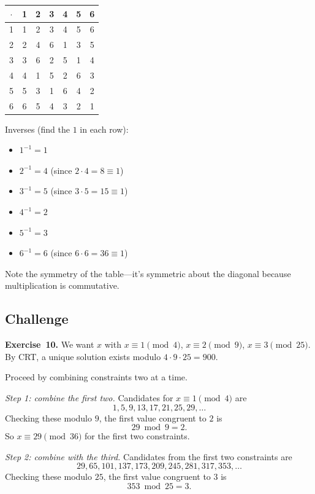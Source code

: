 \documentclass[11pt]{article}
\begin{document}
\begin{center}
\begin{tabular}{c|cccccc}
\toprule
$\cdot$ & 1 & 2 & 3 & 4 & 5 & 6 \\
\midrule
1 & 1 & 2 & 3 & 4 & 5 & 6 \\
2 & 2 & 4 & 6 & 1 & 3 & 5 \\
3 & 3 & 6 & 2 & 5 & 1 & 4 \\
4 & 4 & 1 & 5 & 2 & 6 & 3 \\
5 & 5 & 3 & 1 & 6 & 4 & 2 \\
6 & 6 & 5 & 4 & 3 & 2 & 1 \\
\bottomrule
\end{tabular}
\end{center}
Inverses (find the $1$ in each row):
\begin{itemize}
  \item $1^{-1} = 1$
  \item $2^{-1} = 4$ (since $2 \cdot 4 = 8 \equiv 1$)
  \item $3^{-1} = 5$ (since $3 \cdot 5 = 15 \equiv 1$)
  \item $4^{-1} = 2$
  \item $5^{-1} = 3$
  \item $6^{-1} = 6$ (since $6 \cdot 6 = 36 \equiv 1$)
\end{itemize}
Note the symmetry of the table---it's symmetric about the diagonal because multiplication is commutative.

\subsection*{Challenge}

\textbf{Exercise~10.}
We want $x$ with $x \equiv 1 \pmod 4$, $x \equiv 2 \pmod 9$, $x \equiv 3 \pmod{25}$. By CRT, a unique solution exists modulo $4 \cdot 9 \cdot 25 = 900$.

Proceed by combining constraints two at a time.

\emph{Step 1: combine the first two.} Candidates for
$x \equiv 1 \pmod 4$ are
\[
  1, 5, 9, 13, 17, 21, 25, 29, \ldots
\]
Checking these modulo $9$, the first value congruent to $2$ is
\[
  29 \bmod 9 = 2.
\]
So $x \equiv 29 \pmod{36}$ for the first two constraints.

\emph{Step 2: combine with the third.} Candidates from the first two
constraints are
\[
  29, 65, 101, 137, 173, 209, 245, 281, 317, 353, \ldots
\]
Checking these modulo $25$, the first value congruent to $3$ is
\[
  353 \bmod 25 = 3.
\]
\end{document}
